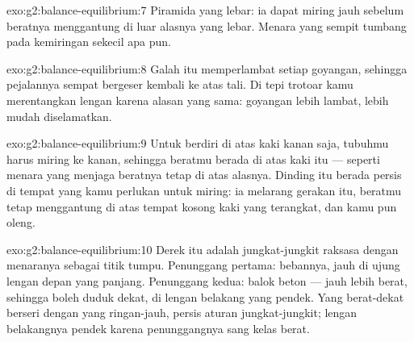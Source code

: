 \begin{solution}{exo:g2:balance-equilibrium:7}
Piramida yang lebar: ia dapat miring jauh sebelum beratnya menggantung
di luar alasnya yang lebar. Menara yang sempit tumbang pada kemiringan
sekecil apa pun.
\end{solution}

\begin{solution}{exo:g2:balance-equilibrium:8}
Galah itu memperlambat setiap goyangan, sehingga pejalannya sempat
bergeser kembali ke atas tali. Di tepi trotoar kamu merentangkan
lengan karena alasan yang sama: goyangan lebih lambat, lebih mudah
diselamatkan.
\end{solution}

\begin{solution}{exo:g2:balance-equilibrium:9}
Untuk berdiri di atas kaki kanan saja, tubuhmu harus miring ke kanan,
sehingga beratmu berada di atas kaki itu --- seperti menara yang
menjaga beratnya tetap di atas alasnya. Dinding itu berada persis di
tempat yang kamu perlukan untuk miring: ia melarang gerakan itu,
beratmu tetap menggantung di atas tempat kosong kaki yang terangkat,
dan kamu pun oleng.
\end{solution}

\begin{solution}{exo:g2:balance-equilibrium:10}
Derek itu adalah jungkat-jungkit raksasa dengan menaranya sebagai
titik tumpu. Penunggang pertama: bebannya, jauh di ujung lengan depan
yang panjang. Penunggang kedua: balok beton --- jauh lebih berat,
sehingga boleh duduk dekat, di lengan belakang yang pendek. Yang
berat-dekat berseri dengan yang ringan-jauh, persis aturan
jungkat-jungkit; lengan belakangnya pendek karena penunggangnya sang
kelas berat.
\end{solution}
